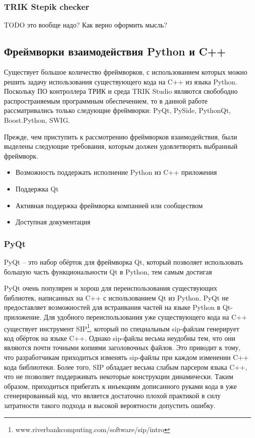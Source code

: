 \documentclass[14pt]{matmex-diploma-custom}
\begin{document}
\subsubsection{TRIK Stepik checker}

TODO это вообще надо? Как верно оформить мысль?

\subsection{Фреймворки взаимодействия Python и C++}

Существует большое количество фреймворков, с использованием которых можно решить задачу использования существующего кода на C++ из языка Python. Поскольку ПО контроллера ТРИК и среда TRIK Studio являются свобободно распространяемым программным обеспечением, то в данной работе рассматривались только следующие фреймворки: PyQt, PySide, PythonQt, Boost.Python, SWIG.

Прежде, чем приступить к рассмотрению фреймворков взаимодействия, были выделены следующие требования, которым должен удовлетворять выбранный фреймворк.

\begin{itemize}
    \item Возможность поддержать исполнение Python из C++ приложения
    \item Поддержка Qt
    \item Активная поддержка фреймворка компанией или сообществом
    \item Доступная документация
\end{itemize}

\subsubsection{PyQt}

PyQt \cite{pyqt} -- это набор обёрток для фреймворка Qt, который позволяет использовать большую часть функциональности Qt в Python, тем самым достигая 

PyQt очень популярен и хорош для переиспользования существующих библиотек, написанных на C++ с использованием Qt из Python. PyQt не предоставляет возможностей для встраивания частей на языке Python в Qt-приложение. Для удобного переиспользования уже существующего кода на C++ существует инструмент SIP\footnote{www.riverbankcomputing.com/software/sip/intro}, который по специальным sip-файлам генерирует код обёрток на языке C++. Однако sip-файлы весьма неудобны тем, что они являются почти точными копиями заголовочных файлов. Это приводит к тому, что разработчикам приходиться изменять sip-файлы при каждом изменении C++ кода библиотеки. Более того, SIP обладает весьма слабым парсером языка C++, что не позволяет поддерживать некоторые конструкции динамически. Таким образом, приходиться прибегать к инъекциям дописанного руками кода в уже сгенерированный код, что является достаточно плохой практикой в силу затратности такого подхода и высокой вероятности допустить ошибку.
\end{document}
